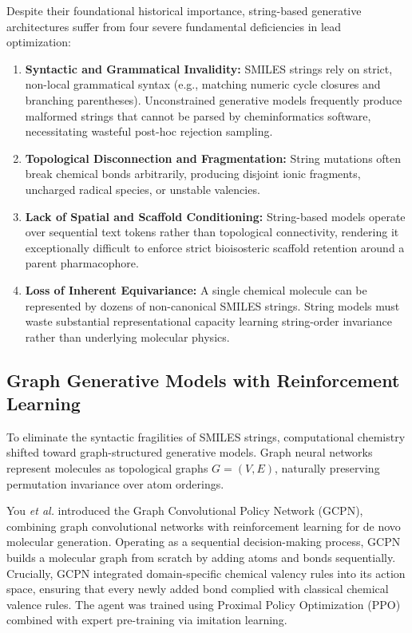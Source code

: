 \documentclass{ieeeaccess}
\begin{document}
Despite their foundational historical importance, string-based generative architectures suffer from four severe fundamental deficiencies in lead optimization:
\begin{enumerate}
    \item \textbf{Syntactic and Grammatical Invalidity:} SMILES strings rely on strict, non-local grammatical syntax (e.g., matching numeric cycle closures and branching parentheses). Unconstrained generative models frequently produce malformed strings that cannot be parsed by cheminformatics software, necessitating wasteful post-hoc rejection sampling.
    \item \textbf{Topological Disconnection and Fragmentation:} String mutations often break chemical bonds arbitrarily, producing disjoint ionic fragments, uncharged radical species, or unstable valencies.
    \item \textbf{Lack of Spatial and Scaffold Conditioning:} String-based models operate over sequential text tokens rather than topological connectivity, rendering it exceptionally difficult to enforce strict bioisosteric scaffold retention around a parent pharmacophore.
    \item \textbf{Loss of Inherent Equivariance:} A single chemical molecule can be represented by dozens of non-canonical SMILES strings. String models must waste substantial representational capacity learning string-order invariance rather than underlying molecular physics.
\end{enumerate}

\subsection{Graph Generative Models with Reinforcement Learning}
To eliminate the syntactic fragilities of SMILES strings, computational chemistry shifted toward graph-structured generative models. Graph neural networks represent molecules as topological graphs $G=(V, E)$, naturally preserving permutation invariance over atom orderings.

You \emph{et al.} \cite{you2018} introduced the Graph Convolutional Policy Network (GCPN), combining graph convolutional networks with reinforcement learning for de novo molecular generation. Operating as a sequential decision-making process, GCPN builds a molecular graph from scratch by adding atoms and bonds sequentially. Crucially, GCPN integrated domain-specific chemical valency rules into its action space, ensuring that every newly added bond complied with classical chemical valence rules. The agent was trained using Proximal Policy Optimization (PPO) combined with expert pre-training via imitation learning.
\end{document}
